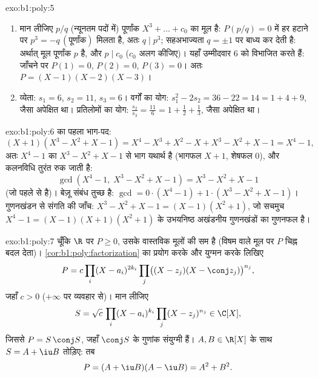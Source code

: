 \begin{solution}{exo:b1:poly:5}
\begin{enumerate}
  \item मान लीजिए $p/q$ (न्यूनतम पदों में)  पूर्णांक  $X^3 +
  \dots + c_0$ का मूल है: $P(p/q) = 0$ में हर हटाने पर $p^3 =
  -q\,(\text{पूर्णांक})$ मिलता है, अतः $q \mid p^3$; सहअभाज्यता $q = \pm 1$
  पर बाध्य कर देती है: अर्थात् मूल पूर्णांक $p$ है, और $p \mid c_0$ ($c_0$
  अलग कीजिए)। यहाँ उम्मीदवार $6$ को विभाजित करते हैं: जाँचने पर $P(1) = 0$,
  $P(2) = 0$, $P(3) = 0$। अतः $P = (X-1)(X-2)(X-3)$।
  \item व्येता: $s_1 = 6$, $s_2 = 11$, $s_3 = 6$। वर्गों का योग: $s_1^2 -
  2s_2 = 36 - 22 = 14 = 1 + 4 + 9$, जैसा अपेक्षित था। प्रतिलोमों का योग:
  $\frac{s_2}{s_3} = \frac{11}{6} = 1 + \frac12 + \frac13$, जैसा अपेक्षित
  था।
\end{enumerate}
\end{solution}

\begin{solution}{exo:b1:poly:6}
 का पहला भाग-पद:
\[
(X + 1)(X^3 - X^2 + X - 1)
= X^4 - X^3 + X^2 - X + X^3 - X^2 + X - 1 = X^4 - 1 ,
\]
अतः $X^4 - 1$ का $X^3 - X^2 + X - 1$ से भाग यथार्थ है (भागफल $X + 1$, शेषफल
$0$), और कलनविधि तुरंत रुक जाती है:
\[
\gcd(X^4 - 1,\; X^3 - X^2 + X - 1) = X^3 - X^2 + X - 1
\]
(जो पहले से  है)। बेज़ू संबंध तुच्छ है: $\gcd = 0 \cdot (X^4 - 1) +
1 \cdot (X^3 - X^2 + X - 1)$। गुणनखंडन से संगति की जाँच: $X^3 - X^2 + X - 1
= (X - 1)(X^2 + 1)$, जो सचमुच $X^4 - 1 = (X-1)(X+1)(X^2+1)$ के उभयनिष्ठ
अखंडनीय गुणनखंडों का गुणनफल है।
\end{solution}

\begin{solution}{exo:b1:poly:7}
चूँकि $\R$ पर $P \geq 0$, उसके वास्तविक मूलों की  सम है (विषम 
वाले मूल पर $P$ चिह्न बदल देता)। \cref{cor:b1:poly:factorization} का प्रयोग
करके और युग्मन करके लिखिए
\[
P = c \prod_i (X - a_i)^{2k_i} \prod_j \bigl((X - z_j)(X - \conj
z_j)\bigr)^{n_j},
\]
जहाँ $c > 0$ ($+\infty$ पर व्यवहार से)। मान लीजिए
\[
S = \sqrt c\, \prod_i (X - a_i)^{k_i} \prod_j (X - z_j)^{n_j}
\in \C[X],
\]
जिससे $P = S\,\conj S$, जहाँ $\conj S$ के गुणांक संयुग्मी हैं। $A, B \in
\R[X]$ के साथ $S = A + \iu B$ तोड़िए: तब
\[
P = (A + \iu B)(A - \iu B) = A^2 + B^2 .
\]
\end{solution}

